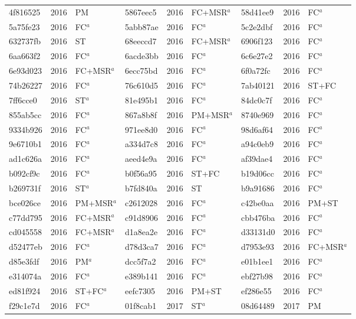 \begin{longtable}{lll@{\hspace{10pt}}lll@{\hspace{10pt}}lll}
4f816525 & 2016 & PM & 5867eec5 & 2016 & FC+MSR$^{a}$ & 58d41ee9 & 2016 & FC$^{a}$ \\
5a75fe23 & 2016 & FC$^{a}$ & 5abb87ae & 2016 & FC$^{a}$ & 5c2e2dbf & 2016 & FC$^{a}$ \\
632737fb & 2016 & ST & 68eeccd7 & 2016 & FC+MSR$^{a}$ & 6906f123 & 2016 & FC$^{a}$ \\
6aa663f2 & 2016 & FC$^{a}$ & 6acde3bb & 2016 & FC$^{a}$ & 6c6e27e2 & 2016 & FC$^{a}$ \\
6e93d023 & 2016 & FC+MSR$^{a}$ & 6ecc75bd & 2016 & FC$^{a}$ & 6f0a72fc & 2016 & FC$^{a}$ \\
74b26227 & 2016 & FC$^{a}$ & 76c610d5 & 2016 & FC$^{a}$ & 7ab40121 & 2016 & ST+FC \\
7ff6cce0 & 2016 & ST$^{a}$ & 81e495b1 & 2016 & FC$^{a}$ & 84dc0c7f & 2016 & FC$^{a}$ \\
855ab5cc & 2016 & FC$^{a}$ & 867a8b8f & 2016 & PM+MSR$^{a}$ & 8740e969 & 2016 & FC$^{a}$ \\
9334b926 & 2016 & FC$^{a}$ & 971ee8d0 & 2016 & FC$^{a}$ & 98d6af64 & 2016 & FC$^{a}$ \\
9e6710b1 & 2016 & FC$^{a}$ & a334d7c8 & 2016 & FC$^{a}$ & a94c0eb9 & 2016 & FC$^{a}$ \\
ad1c626a & 2016 & FC$^{a}$ & aeed4e9a & 2016 & FC$^{a}$ & af39dae4 & 2016 & FC$^{a}$ \\
b092cf9c & 2016 & FC$^{a}$ & b0f56a95 & 2016 & ST+FC & b19d06cc & 2016 & FC$^{a}$ \\
b269731f & 2016 & ST$^{a}$ & b7fd840a & 2016 & ST & b9a91686 & 2016 & FC$^{a}$ \\
bce026ce & 2016 & PM+MSR$^{a}$ & c2612028 & 2016 & FC$^{a}$ & c42be0aa & 2016 & PM+ST \\
c77dd795 & 2016 & FC+MSR$^{a}$ & c91d8906 & 2016 & FC$^{a}$ & cbb476ba & 2016 & FC$^{a}$ \\
cd045558 & 2016 & FC+MSR$^{a}$ & d1a8ea2e & 2016 & FC$^{a}$ & d33131d0 & 2016 & FC$^{a}$ \\
d52477eb & 2016 & FC$^{a}$ & d78d3ca7 & 2016 & FC$^{a}$ & d7953e93 & 2016 & FC+MSR$^{a}$ \\
d85e3fdf & 2016 & PM$^{a}$ & dcc5f7a2 & 2016 & FC$^{a}$ & e01b1ee1 & 2016 & FC$^{a}$ \\
e314074a & 2016 & FC$^{a}$ & e389b141 & 2016 & FC$^{a}$ & ebf27b98 & 2016 & FC$^{a}$ \\
ed81f924 & 2016 & ST+FC$^{a}$ & eefc7305 & 2016 & PM+ST & ef286e55 & 2016 & FC$^{a}$ \\
f29c1e7d & 2016 & FC$^{a}$ & 01f8cab1 & 2017 & ST$^{a}$ & 08d64489 & 2017 & PM \\

\end{longtable}
